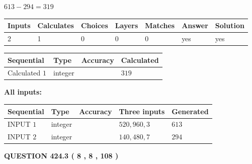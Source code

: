 \documentclass{ctexart}
\begin{document}
 

$ %
613 -  %
294=   %
319$
 
 
\noindent{}
 
 

 
   
   
   
   
\noindent\begin{tabular}{|l|l|l|l|l|l|l|}
 \hline
Inputs & Calculates & Choices & Layers & Matches & Answer & Solution \\ \hline
 2  & 
 1  & 
 0
  & 
 0  & 
 0  & 
  yes & 
  yes 
  \\ \hline
 \end{tabular}
   
   
   
   
\noindent{}
   
   
  
  
\noindent\begin{tabular}{|l|l|l|l|}
\hline
 Sequential & Type & Accuracy & Calculated \\ 
\hline
 
 
  Calculated $  1 $ & integer &  & 
  $ 319 $ 
 \\  \hline  
 \end{tabular}
   
   
   
   
\noindent\vspace{0.1in}\hspace{-0.08in} {\textbf{\Large{All inputs: }}}
   
   
  
  
\noindent\begin{tabular}{|l|l|l|l|l|}
\hline
 Sequential & Type & Accuracy & Three inputs & Generated \\ 
\hline
 
 
  INPUT $  1 $ & integer &  & $
 520
 , 
 960
 , 
 3
 $ & $ 613 $ 
 \\  \hline  
 
 
  INPUT $  2 $ & integer &  & $
 140
 , 
 480
 , 
 7
 $ & $ 294 $ 
 \\  \hline  
 \end{tabular}
   
   
  
\vspace{0.2in}
  
{\textbf{\Large{QUESTION
424.3 
 ( 8 , 8 , 108 )
}}}
  
\end{document}
